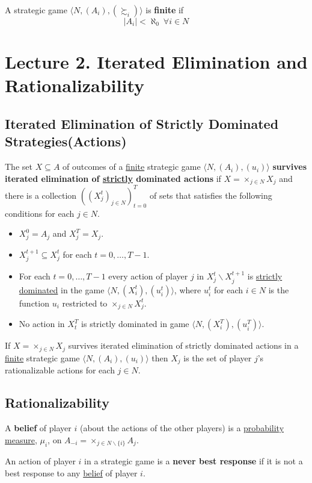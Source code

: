 \documentclass[11pt]{article}
\begin{document}
		\begin{definition}[pg.11]
			A strategic game $\langle N, (A_i), (\succsim_i) \rangle$ is \textbf{finite} if 
			\[
				|A_i| < \aleph_0\ \forall i \in N
			\]
		\end{definition}
		
	\section{Lecture 2. Iterated Elimination and Rationalizability}
		\subsection{Iterated Elimination of Strictly Dominated Strategies(Actions)}
			\begin{definition}[60.2]
				The set $X \subseteq A$ of outcomes of a \ul{finite} strategic game $\langle N, (A_i), (u_i) \rangle$ \textbf{survives iterated elimination of \ul{strictly} dominated actions} if $X = \times_{j \in N} X_j$ and there is a collection $((X_j^t)_{j \in N})_{t=0}^T$ of sets that satisfies the following conditions for each $j \in N$.
				\begin{itemize}
					\item $X_j^0 = A_j$ and $X_j^T = X_j$.
					\item $X_j^{t+1} \subseteq X_j^t$ for each $t = 0, \dots, T - 1$.
					\item For each $t = 0, \dots, T-1$ every action of player $j$ in $X_j^t \backslash X_j^{t+1}$ is \ul{strictly dominated} in the game $\langle N, (X_i^t), (u_i^t) \rangle$, where $u_i^t$ for each $i \in N$ is the function $u_i$ restricted to $\times_{j \in N} X_j^t$.
					\item No action in $X_t^T$ is strictly dominated in game $\langle N, (X_i^T), (u_i^T) \rangle$.
				\end{itemize}
			\end{definition}
			
			\begin{proposition}[61.2]
				If $X = \times_{j \in N}X_j$ survives iterated elimination of strictly dominated actions in a \ul{finite} strategic game $\langle N, (A_i), (u_i) \rangle$ then $X_j$ is the set of player $j$'s rationalizable actions for each $j \in N$.
			\end{proposition}
			
		\subsection{Rationalizability}
			\begin{definition}[pg. 54]
				A \textbf{belief} of player $i$ (about the actions of the other players) is a \ul{probability measure}, $\mu_i$, on $A_{-i}=\times_{j \in N \backslash \{i\}} A_j$.
			\end{definition}
			\begin{definition}[59.1]
				An action of player $i$ in a strategic game is a \textbf{never best response} if it is not a best response to any \ul{belief} of player $i$.
			\end{definition}
			
\end{document}
